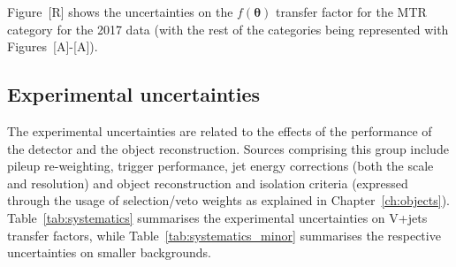 Figure~[R] shows the uncertainties on the $f(\boldsymbol{\theta})$ transfer factor for the MTR category for the 2017 data (with the rest of the categories being represented with Figures~[A]-[A]).
 
\subsection{Experimental uncertainties}
\hspace{10pt} The experimental uncertainties are related to the effects of the performance of the detector and the object reconstruction. Sources comprising this group include pileup re-weighting, trigger performance, jet energy corrections (both the scale and resolution) and object reconstruction and isolation criteria (expressed through the usage of selection/veto weights as explained in Chapter~\ref{ch:objects}). Table~\ref{tab:systematics} summarises the experimental uncertainties on V+jets transfer factors, while Table~\ref{tab:systematics_minor} summarises the respective uncertainties on smaller backgrounds.


